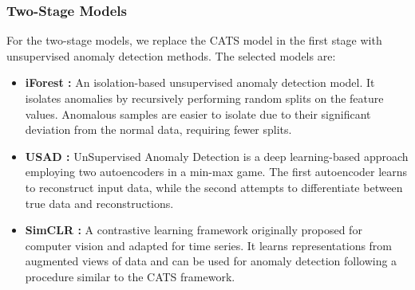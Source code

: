 \subsubsection{Two-Stage Models}
For the two-stage models, we replace the CATS model in the first stage with unsupervised anomaly detection methods. The selected models are:
\begin{itemize}
    \item \textbf{iForest \cite{liu2008isolation}:} An isolation-based unsupervised anomaly detection model. It isolates anomalies by recursively performing random splits on the feature values. Anomalous samples are easier to isolate due to their significant deviation from the normal data, requiring fewer splits.
    \item \textbf{USAD \cite{audibert2020usad}:} UnSupervised Anomaly Detection is a deep learning-based approach employing two autoencoders in a min-max game. The first autoencoder learns to reconstruct input data, while the second attempts to differentiate between true data and reconstructions.
    \item \textbf{SimCLR \cite{chen2020simple}:} A contrastive learning framework originally proposed for computer vision and adapted for time series. It learns representations from augmented views of data and can be used for anomaly detection following a procedure similar to the CATS framework.
\end{itemize}

